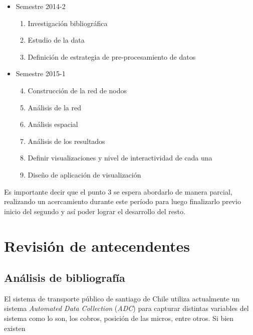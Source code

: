 \documentclass[12pt]{article}
\begin{document}
    \begin{itemize}
    \item Semestre 2014-2
    \begin{enumerate}
    \item Investigación bibliográfica 
    \item Estudio de la data
    \item Definición de estrategia de pre-procesamiento de datos
    \end{enumerate}
    \item Semestre 2015-1
    \begin{enumerate}\setcounter{enumi}{3}
    \item Construcción de la red de nodos
    \item Análisis de la red
    \item Análisis espacial
    \item Análisis de los resultados
    \item Definir visualizaciones y nivel de interactividad de cada una
    \item Diseño de aplicación de visualización
    \end{enumerate}
    \end{itemize}

    Es importante decir que el punto 3 se espera abordarlo de manera parcial, realizando un acercamiento durante este período para luego finalizarlo previo inicio del segundo y así poder lograr el desarrollo del resto.


    \newpage

    \section{Revisión de antecendentes}
        \subsection{Análisis de bibliografía}
    
    
    
    El sistema de transporte público de santiago de Chile utiliza actualmente un sistema \textit{Automated Data Collection} (\textit{ADC}) para capturar distintas variables del sistema como lo son, los cobros, posición de las micros, entre otros. Si bien existen 
\end{document}
